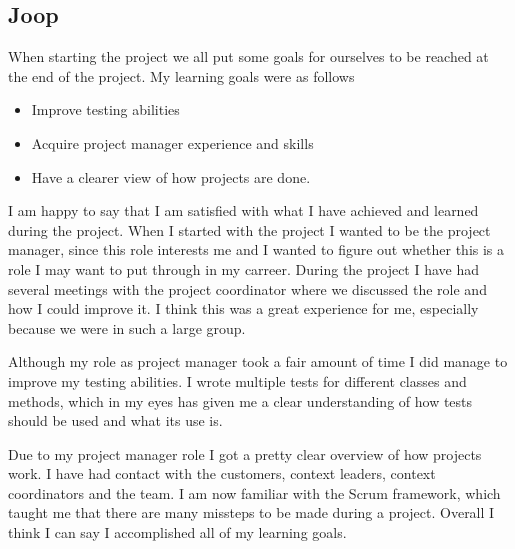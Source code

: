\documentclass{article}
\begin{document}
\subsection*{Joop}
When starting the project we all put some goals for ourselves to be reached at the end of the project. 
My learning goals were as follows
\begin{itemize}
	\item Improve testing abilities
	\item Acquire project manager experience and skills
	\item Have a clearer view of how projects are done.
\end{itemize}

I am happy to say that I am satisfied with what I have achieved and learned during the project. When I started with the project I wanted to be the project manager, since this role interests me and I wanted to figure out whether this is a role I may want to put through in my carreer. During the project I have had several meetings with the project coordinator where we discussed the role and how I could improve it. I think this was a great experience for me, especially because we were in such a large group.

Although my role as project manager took a fair amount of time I did manage to improve my testing abilities. I wrote multiple tests for different classes and methods, which in my eyes has given me a clear understanding of how tests should be used and what its use is.

Due to my project manager role I got a pretty clear overview of how projects work. I have had contact with the customers, context leaders, context coordinators and the team. I am now familiar with the Scrum framework, which taught me that there are many missteps to be made during a project.
Overall I think I can say I accomplished all of my learning goals.
\end{document}
